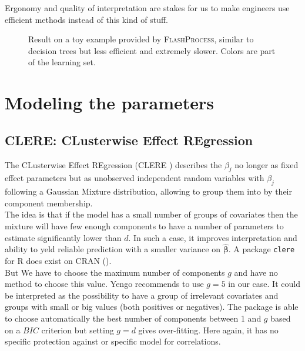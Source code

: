 \documentclass[12pt,a4paper]{report}
\begin{document}
			Ergonomy and quality of interpretation are stakes for us to make engineers use efficient methods instead of this kind of stuff.
	
		\begin{figure}[h!]
	 \quad
	\caption{Result on a toy example provided by \textsc{FlashProcess}, similar to decision trees but less efficient and extremely slower. Colors are part of the learning set.}\label{Regle2D}
\end{figure}	

	\section{Modeling the parameters}			%

		\subsection{CLERE: CLusterwise Effect REgression}		%

			The CLusterwise Effect REgression (\textsc{CLERE} \cite{yengo2012variable}) describes the $\beta_j$ no longer as fixed effect parameters but as unobserved independent random variables with $\beta_j$ following a Gaussian Mixture distribution, allowing to group them into by their component membership. \\
			
			 The idea is that if the model has a small number of groups of covariates then the mixture will have few enough components to have a number of parameters to estimate significantly lower than $d$. In such a case, it improves interpretation and ability to yeld reliable prediction with a smaller variance on $\boldsymbol{\hat{\beta}}$. A package {\tt clere} for R does exist on CRAN (\cite{packageclere}).%
			 \\
			 
			 But We have to choose the maximum number of components $g$ and have no method to choose this value. Yengo recommends to use $g=5$ in our case. It could be interpreted as the possibility to have a group of irrelevant covariates and groups with small or big values (both positives or negatives). The package is able to choose automatically the best number of components between 1 and $g$ based on a $BIC$ criterion but setting $g=d$ gives over-fitting.
	 Here again, it has no specific protection against or specific model for correlations. 
\end{document}
